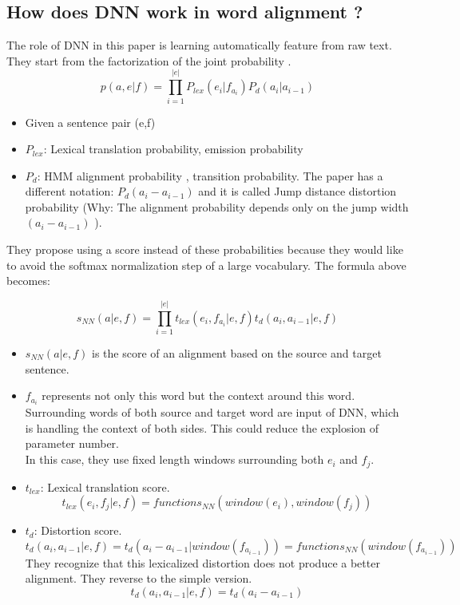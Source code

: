 \documentclass{article}
\begin{document}
\subsection{How does DNN work in word alignment ?}
The role of DNN in this paper is learning automatically feature from raw text.
They start from the factorization of the joint probability \cite{Vogel1996HMM}.
\begin{equation}
p(a, e| f) = \prod_{i = 1}^{|e|} P_{lex}(e_{i}|f_{a_{i}}) P_{d}(a_{i}|a_{i-1})
\end{equation}
	\begin{itemize}
	\item Given a sentence pair (e,f) 
	\item $P_{lex}$: Lexical translation probability, emission probability
	\item $P_{d}$: HMM alignment probability \cite{Vogel1996HMM}, transition probability. The paper has a different notation: $P_{d}(a_{i} - a_{i-1})$ and it is called Jump distance distortion probability (Why: The alignment probability depends only on the jump width $(a_{i} - a_{i-1})$ \cite{Vogel1996HMM}).
	\end{itemize}

They propose using a score instead of these probabilities because they would like to avoid the softmax normalization step of a large vocabulary. The formula above becomes:

\begin{equation}
s_{NN}(a|e, f) = \prod_{i = 1}^{|e|} t_{lex}(e_{i},f_{a_{i}}|e,f) t_{d}(a_{i},a_{i-1}|e,f)
\label{Yang13word NN Alignment Score}
\end{equation}

	\begin{itemize}
	\item $s_{NN}(a|e, f)$ is the score of an alignment based on the source and target sentence.
	\item $f_{a_{i}}$ represents not only this word but the context around this word. Surrounding words of both source and target word are input of DNN, which is handling the context of both sides. This could reduce the explosion of parameter number. \\ In this case, they use fixed length windows surrounding both $e_{i}$ and $f_{j}$. 
	\item $t_{lex}$: Lexical translation score.
	\begin{equation}
	t_{lex}(e_{i},f_{j}|e,f) = functions_{NN}(window(e_{i}),window(f_{j}) )
	\label{Yang13word Lexical Translation Score}
	\end{equation}
	\item $t_{d}$: Distortion score.
	\begin{equation}
	t_{d}(a_{i}, a_{i-1}|e,f) = t_{d}(a_{i} - a_{i-1}|window(f_{a_{i-1}})) = functions_{NN}(window(f_{a_{i-1}}))
	\end{equation}
	They recognize that this lexicalized distortion does not produce a better alignment. They reverse to the simple version.
	\begin{equation}
	t_{d}(a_{i}, a_{i-1}|e,f) = t_{d}(a_{i} - a_{i-1})
	\end{equation}
	\end{itemize}
\end{document}
